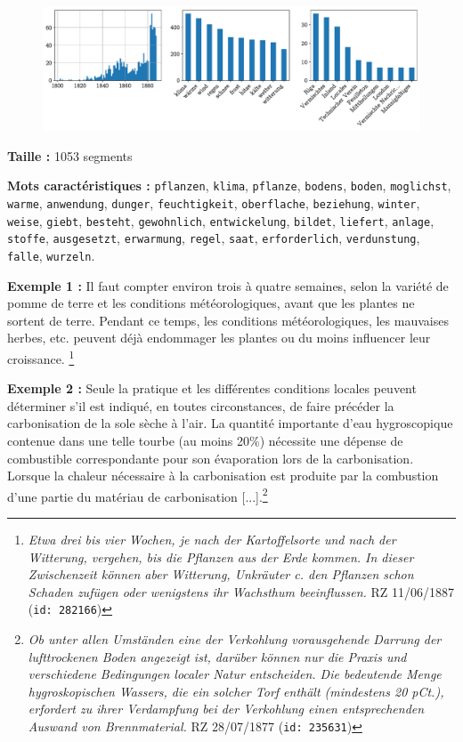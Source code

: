 \documentclass[a4paper,twoside,12pt]{article}
\begin{document}
\begin{figure}[H]
\centering
\includegraphics[width=\textwidth]{images/topic_charts_1.pdf}
\end{figure}

\begin{flushleft}
\textbf{Taille :} 1053 segments

\textbf{Mots caractéristiques :} \texttt{pflanzen}, \texttt{klima}, \texttt{pflanze}, \texttt{bodens}, \texttt{boden}, \texttt{moglichst}, \texttt{warme}, \texttt{anwendung}, \texttt{dunger}, \texttt{feuchtigkeit}, \texttt{oberflache}, \texttt{beziehung}, \texttt{winter}, \texttt{weise}, \texttt{giebt}, \texttt{besteht}, \texttt{gewohnlich}, \texttt{entwickelung}, \texttt{bildet}, \texttt{liefert}, \texttt{anlage}, \texttt{stoffe}, \texttt{ausgesetzt}, \texttt{erwarmung}, \texttt{regel}, \texttt{saat}, \texttt{erforderlich}, \texttt{verdunstung}, \texttt{falle}, \texttt{wurzeln}.
\end{flushleft}

\medskip

\noindent \textbf{Exemple 1 :} \og Il faut compter environ trois à quatre semaines, selon la variété de pomme de terre et les conditions météorologiques, avant que les plantes ne sortent de terre. Pendant ce temps, les conditions météorologiques, les mauvaises herbes, etc. peuvent déjà endommager les plantes ou du moins influencer leur croissance. \fg{}\footnote{\textit{Etwa drei bis vier Wochen, je nach der Kartoffelsorte und nach der Witterung, vergehen, bis die Pflanzen aus der Erde kommen. In dieser Zwischenzeit können aber Witterung, Unkräuter c. den Pflanzen schon Schaden zufügen oder wenigstens ihr Wachsthum beeinflussen.} RZ 11/06/1887 (\texttt{id: 282166})}

\noindent \textbf{Exemple 2 :} \og Seule la pratique et les différentes conditions locales peuvent déterminer s'il est indiqué, en toutes circonstances, de faire précéder la carbonisation de la sole sèche à l'air. La quantité importante d'eau hygroscopique contenue dans une telle tourbe (au moins 20\%) nécessite une dépense de combustible correspondante pour son évaporation lors de la carbonisation. Lorsque la chaleur nécessaire à la carbonisation est produite par la combustion d'une partie du matériau de carbonisation \fg{} [...].\footnote{\textit{Ob unter allen Umständen eine der Verkohlung vorausgehende Darrung der lufttrockenen Boden angezeigt ist, darüber können nur die Praxis und verschiedene Bedingungen localer Natur entscheiden. Die bedeutende Menge hygroskopischen Wassers, die ein solcher Torf enthält (mindestens 20 pCt.), erfordert zu ihrer Verdampfung bei der Verkohlung einen entsprechenden Auswand von Brennmaterial.} RZ 28/07/1877 (\texttt{id: 235631})}
\end{document}
